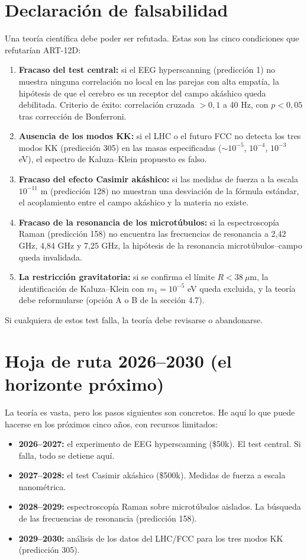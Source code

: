 \section{Declaración de falsabilidad}
Una teoría científica debe poder ser refutada. Estas son las cinco condiciones que refutarían ART-12D:
\begin{enumerate}
    \item \textbf{Fracaso del test central:} si el EEG hyperscanning (predicción 1) no muestra ninguna correlación no local en las parejas con alta empatía, la hipótesis de que el cerebro es un receptor del campo akáshico queda debilitada. Criterio de éxito: correlación cruzada $> 0,1$ a 40 Hz, con $p < 0,05$ tras corrección de Bonferroni.
    \item \textbf{Ausencia de los modos KK:} si el LHC o el futuro FCC no detecta los tres modos KK (predicción 305) en las masas especificadas ($\sim 10^{-5}$, $10^{-4}$, $10^{-3}$ eV), el espectro de Kaluza--Klein propuesto es falso.
    \item \textbf{Fracaso del efecto Casimir akáshico:} si las medidas de fuerza a la escala $10^{-11}$ m (predicción 128) no muestran una desviación de la fórmula estándar, el acoplamiento entre el campo akáshico y la materia no existe.
    \item \textbf{Fracaso de la resonancia de los microtúbulos:} si la espectroscopía Raman (predicción 158) no encuentra las frecuencias de resonancia a 2,42 GHz, 4,84 GHz y 7,25 GHz, la hipótesis de la resonancia microtúbulos--campo queda invalidada.
    \item \textbf{La restricción gravitatoria:} si se confirma el límite $R < 38\ \mu$m, la identificación de Kaluza--Klein con $m_1 = 10^{-5}$ eV queda excluida, y la teoría debe reformularse (opción A o B de la sección 4.7).
\end{enumerate}
Si cualquiera de estos test falla, la teoría debe revisarse o abandonarse.

\section{Hoja de ruta 2026--2030 (el horizonte próximo)}
La teoría es vasta, pero los pasos siguientes son concretos. He aquí lo que puede hacerse en los próximos cinco años, con recursos limitados:
\begin{itemize}
    \item \textbf{2026--2027:} el experimento de EEG hyperscanning (\$50k). El test central. Si falla, todo se detiene aquí.
    \item \textbf{2027--2028:} el test Casimir akáshico (\$500k). Medidas de fuerza a escala nanométrica.
    \item \textbf{2028--2029:} espectroscopía Raman sobre microtúbulos aislados. La búsqueda de las frecuencias de resonancia (predicción 158).
    \item \textbf{2029--2030:} análisis de los datos del LHC/FCC para los tres modos KK (predicción 305).
\end{itemize}

\newpage
